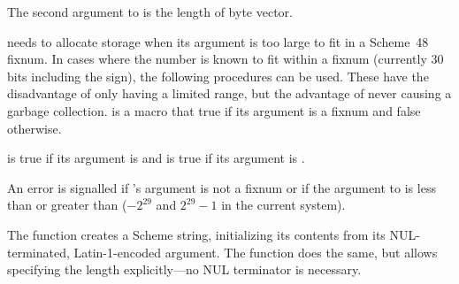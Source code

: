 The second argument to  is the length of
 byte vector.

 needs to allocate storage when
 its argument is too large to fit in a Scheme~48 fixnum.
In cases where the number is known to fit within a fixnum (currently 30 bits
 including the sign), the following procedures can be used.
These have the disadvantage of only having a limited range, but
 the advantage of never causing a garbage collection.
 is a macro that true if its argument is a fixnum
 and false otherwise.

\begin{protos}
\end{protos}

\noindent {} is true if its argument is 
 and  is true if its argument is .

\begin{protos}
\end{protos}

\noindent An error is signalled if 's argument
 is not a fixnum or if the argument to  is less than
  or greater than 
 ($-2^{29}$ and $2^{29}-1$ in the current system).

\begin{protos}
\end{protos}
%
The  function creates a Scheme
string, initializing its contents from its NUL-terminated,
Latin-1-encoded argument.  The 
function does the same, but allows specifying the length explicitly---no NUL
terminator is necessary.

